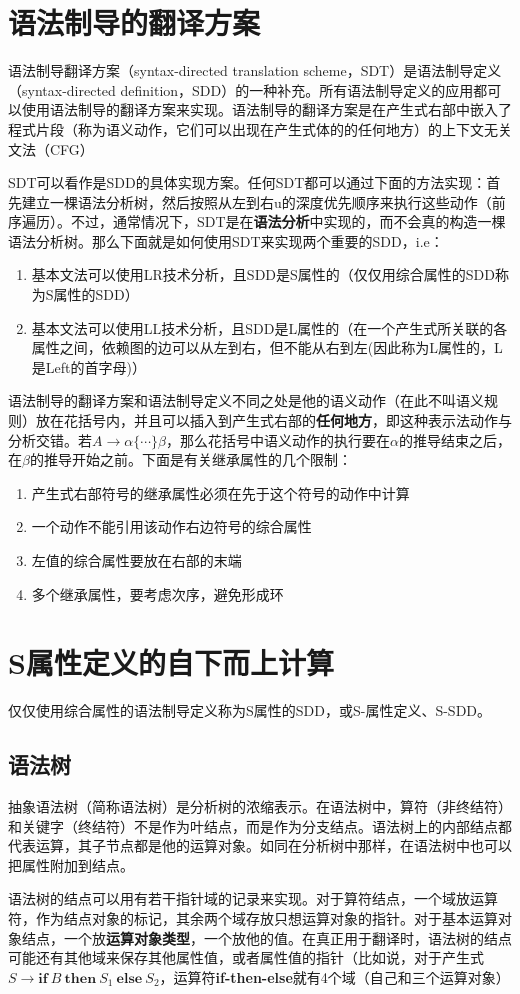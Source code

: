 \documentclass[]{report}
\begin{document}
	\section{语法制导的翻译方案}\label{section:Trans_Recipe}
	语法制导翻译方案（syntax-directed translation scheme，SDT）是语法制导定义（syntax-directed definition，SDD）的一种补充。所有语法制导定义的应用都可以使用语法制导的翻译方案来实现。语法制导的翻译方案是在产生式右部中嵌入了程式片段（称为语义动作，它们可以出现在产生式体的的任何地方）的上下文无关文法（CFG）\par
	SDT可以看作是SDD的具体实现方案。任何SDT都可以通过下面的方法实现：首先建立一棵语法分析树，然后按照从左到右u的深度优先顺序来执行这些动作（前序遍历）。不过，通常情况下，SDT是在\textbf{语法分析}中实现的，而不会真的构造一棵语法分析树。那么下面就是如何使用SDT来实现两个重要的SDD，i.e：
	\begin{enumerate}
		\item 基本文法可以使用LR技术分析，且SDD是S属性的（仅仅用综合属性的SDD称为S属性的SDD）
		\item 基本文法可以使用LL技术分析，且SDD是L属性的（在一个产生式所关联的各属性之间，依赖图的边可以从左到右，但不能从右到左(因此称为L属性的，L是Left的首字母)）
	\end{enumerate}
	语法制导的翻译方案和语法制导定义不同之处是他的语义动作（在此不叫语义规则）放在花括号内，并且可以插入到产生式右部的\textbf{任何地方}，即这种表示法动作与分析交错。若$A\to\alpha\{\cdots\}\beta$，那么花括号中语义动作的执行要在$\alpha$的推导结束之后，在$\beta$的推导开始之前。下面是有关继承属性的几个限制：
	\begin{enumerate}
		\item 产生式右部符号的继承属性必须在先于这个符号的动作中计算
		\item 一个动作不能引用该动作右边符号的综合属性
		\item 左值的综合属性要放在右部的末端
		\item 多个继承属性，要考虑次序，避免形成环
	\end{enumerate}
	\section{S属性定义的自下而上计算}
	仅仅使用综合属性的语法制导定义称为S属性的SDD，或S-属性定义、S-SDD。
		\subsection{语法树}
		抽象语法树（简称语法树）是分析树的浓缩表示。在语法树中，算符（非终结符）和关键字（终结符）不是作为叶结点，而是作为分支结点。语法树上的内部结点都代表运算，其子节点都是他的运算对象。如同在分析树中那样，在语法树中也可以把属性附加到结点。\par
		语法树的结点可以用有若干指针域的记录来实现。对于算符结点，一个域放运算符，作为结点对象的标记，其余两个域存放只想运算对象的指针。对于基本运算对象结点，一个放\textbf{运算对象类型}，一个放他的值。在真正用于翻译时，语法树的结点可能还有其他域来保存其他属性值，或者属性值的指针（比如说，对于产生式$S\to\mathbf{if}\ B\ \mathbf{then}\ S_1\ \mathbf{else}\ S_2$，运算符\textbf{if-then-else}就有4个域（自己和三个运算对象）
\end{document}
